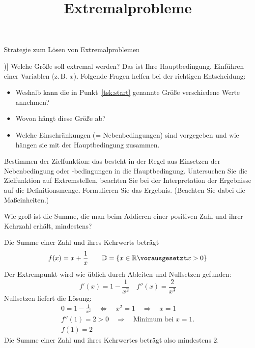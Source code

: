 \documentclass[auto-toc=false,babel=ngerman]{arbeitsblatt}
\title{Extremalprobleme}
\begin{document}
\maketitle

\begin{info}
  Strategie zum Lösen von Extremalproblemen
  \begin{tasks}[counter-format=(tsk[1])]
    \task\label{tsk:start} Welche Größe soll extremal werden?  Das ist Ihre
      Hauptbedingung.
    \task Einführen einer Variablen (z.\,B. $x$).  Folgende Fragen helfen bei
    der richtigen Entscheidung:
    \begin{itemize}
      \item Weshalb kann die in Punkt~\ref{tsk:start} genannte Größe
        verschiedene Werte annehmen?
      \item Wovon hängt diese Größe ab?
      \item Welche Einschränkungen (= Nebenbedingungen) sind vorgegeben und
        wie hängen sie mit der Hauptbedingung zusammen.
    \end{itemize}
    \task Bestimmen der Zielfunktion: das besteht in der Regel aus Einsetzen
      der Nebenbedingung oder -bedingungen in die  Hauptbedingung.
    \task Untersuchen Sie die Zielfunktion auf Extremstellen, beachten Sie bei
    der Interpretation der Ergebnisse auf die Definitionsmenge.
    \task Formulieren Sie das Ergebnis. (Beachten Sie dabei die Maßeinheiten.)
  \end{tasks}
\end{info}


\begin{question}
  Wie groß ist die Summe, die man beim Addieren einer positiven Zahl und ihrer
  Kehrzahl erhält, mindestens?
\end{question}
\begin{solution}
  Die Summe einer Zahl und ihres Kehrwerts beträgt
  \begin{equation*}
    f(x) = x + \frac{1}{x} \qquad
    \definitionsmenge = \menge{x\in\reelle\vorausgesetzt x>0}
  \end{equation*}
  Der Extrempunkt wird wie üblich durch Ableiten und Nullsetzen gefunden:
  \begin{equation*}
    f'(x)  = 1 - \frac{1}{x^2} \quad
    f''(x) = \frac{2}{x^3}
  \end{equation*}
  Nullsetzen liefert die Lösung:
  \begin{gather*}
    0 = 1 - \frac{1}{x^2}
    \quad \Leftrightarrow \quad
    x^2 = 1
    \quad \Rightarrow \quad x = 1 \\
    f''(1) = 2 > 0
    \quad \Rightarrow\quad
    \text{Minimum bei $x=1$.}\\
    f(1) = 2
  \end{gather*}
  Die Summe einer Zahl und ihres Kehrwertes beträgt also mindestens $2$.
\end{solution}
\end{document}
